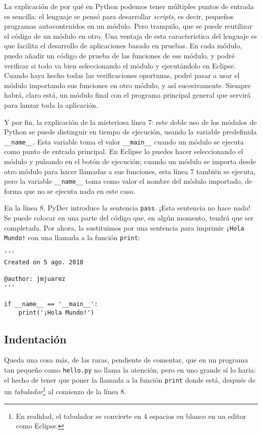 La explicación de por qué en Python podemos tener múltiples puntos de entrada es sencilla: el lenguaje se pensó para desarrollar \emph{scripts}, es decir, pequeños programas autocontenidos en un módulo. Pero tranquilo, que se puede reutilizar el código de un módulo en otro. Una ventaja de esta característica del lenguaje es que facilita el desarrollo de aplicaciones basado en pruebas. En cada módulo, puedo añadir un código de prueba de las funciones de ese módulo, y podré verificar si todo va bien seleccionando el módulo y ejecutándolo en Eclipse. Cuando haya hecho todas las verificaciones oportunas, podré pasar a usar el módulo importando sus funciones en otro módulo, y así sucesivamente. Siempre habrá, claro está, un módulo final con el programa principal general que servirá para lanzar toda la aplicación.

Y por fin, la explicación de la misteriosa línea 7: este doble uso de los módulos de Python se puede distinguir en tiempo de ejecución, usando la variable predefinida \texttt{\_\_name\_\_}. Esta variable toma el valor \texttt{\_\_main\_\_} cuando un módulo se ejecuta como punto de entrada principal. En Eclipse lo puedes hacer seleccionando el módulo y pulsando en el botón de ejecución; cuando un módulo se importa desde otro módulo para hacer llamadas a sus funciones, esta línea 7 también se ejecuta, pero la variable \texttt{\_\_name\_\_} toma como valor el nombre del módulo importado, de forma que no se ejecuta nada en este caso.

En la línea 8, PyDev introduce la sentencia \texttt{pass}. ¡Esta sentencia no hace nada! Se puede colocar en una parte del código que, en algún momento, tendrá que ser completada. Por ahora, la sustituimos por una sentencia para imprimir \texttt{¡Hola Mundo!} con una llamada a la función \texttt{print}:

\begin{lstlisting}
'''
Created on 5 ago. 2018

@author: jmjuarez
'''

if __name__ == '__main__':
    print('¡Hola Mundo!')
\end{lstlisting}

\subsection{Indentación}

Queda una cosa más, de las raras, pendiente de comentar, que en un programa tan pequeño como \texttt{hello.py} no llama la atención, pero en uno grande sí lo haría: el hecho de tener que poner la llamada a la función \texttt{print} donde está, después de un \emph{tabulador}\footnote{En realidad, el tabulador se convierte en 4 espacios en blanco en un editor como Eclipse.} al comienzo de la línea 8. 

